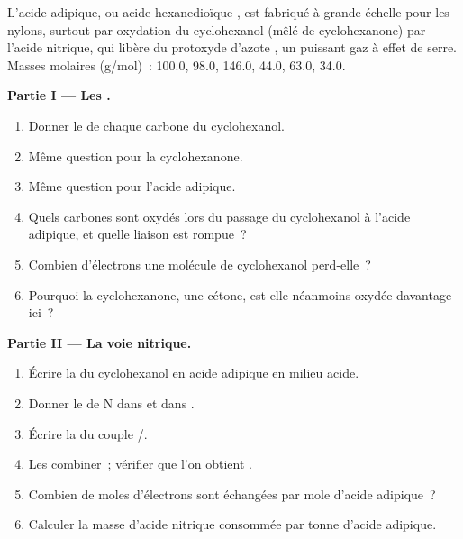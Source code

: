 \begin{problem}
\label{pb:b1:organic-redox:1}
L'acide adipique, ou acide hexanedioïque , est
fabriqué à grande échelle pour les nylons, surtout par oxydation du
cyclohexanol (mêlé de cyclohexanone) par l'acide nitrique, qui libère du
protoxyde d'azote , un puissant gaz à effet de serre. Masses
molaires (\unit{g/mol})~:  100.0,
 98.0,  146.0,  44.0,  63.0,
 34.0.

\medskip
\noindent\textbf{Partie I --- Les .}
\begin{enumerate}
  \item Donner le  de chaque carbone du cyclohexanol.
  \item Même question pour la cyclohexanone.
  \item Même question pour l'acide adipique.
  \item Quels carbones sont oxydés lors du passage du cyclohexanol à
        l'acide adipique, et quelle liaison est rompue~?
  \item Combien d'électrons une molécule de cyclohexanol perd-elle~?
  \item Pourquoi la cyclohexanone, une cétone, est-elle néanmoins oxydée
        davantage ici~?
\end{enumerate}

\medskip
\noindent\textbf{Partie II --- La voie nitrique.}
\begin{enumerate}[resume]
  \item Écrire la  du cyclohexanol en acide adipique en
        milieu acide.
  \item Donner le  de N dans  et dans
        .
  \item Écrire la  du couple /.
  \item Les combiner~; vérifier que l'on obtient
        .
  \item Combien de moles d'électrons sont échangées par mole d'acide
        adipique~?
  \item Calculer la masse d'acide nitrique consommée par tonne d'acide
        adipique.
\end{enumerate}


\end{problem}
